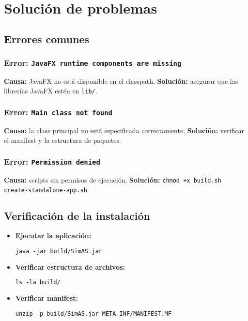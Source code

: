 \section{Solución de problemas}

\subsection{Errores comunes}

\subsubsection{Error: \texttt{JavaFX runtime components are missing}}
\textbf{Causa:} JavaFX no está disponible en el classpath.
\textbf{Solución:} asegurar que las librerías JavaFX estén en \texttt{lib/}.

\subsubsection{Error: \texttt{Main class not found}}
\textbf{Causa:} la clase principal no está especificada correctamente.
\textbf{Solución:} verificar el manifest y la estructura de paquetes.

\subsubsection{Error: \texttt{Permission denied}}
\textbf{Causa:} scripts sin permisos de ejecución.
\textbf{Solución:} \texttt{chmod +x build.sh create-standalone-app.sh}.

\subsection{Verificación de la instalación}

\begin{itemize}
    \item \textbf{Ejecutar la aplicación:}
    \begin{lstlisting}[]
    java -jar build/SimAS.jar
    \end{lstlisting}

    \item \textbf{Verificar estructura de archivos:}
    \begin{lstlisting}[]
    ls -la build/
    \end{lstlisting}

    \item \textbf{Verificar manifest:}
    \begin{lstlisting}[]
    unzip -p build/SimAS.jar META-INF/MANIFEST.MF
    \end{lstlisting}
\end{itemize}

